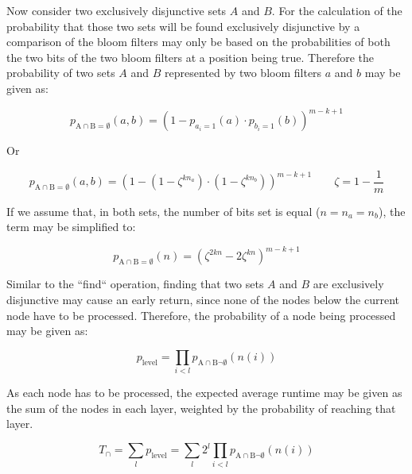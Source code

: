         Now consider two exclusively disjunctive sets $A$ and $B$.
        For the calculation of the probability that those two sets will be found
        exclusively disjunctive by a comparison of the bloom filters may only
        be based on the probabilities of both the two bits of the two bloom
        filters at a position being true.
        Therefore the probability of two sets $A$ and $B$ represented by two
        bloom filters $a$ and $b$ may be given as:

        \begin{equation}
            p_{\mathrm{A \cap B = \emptyset}}(a, b) =
            \left( 1 - p_{a_i = 1}(a) \cdot p_{b_i = 1}(b) \right)^{m-k+1}
        \end{equation}

        Or

        \begin{equation}
            p_{\mathrm{A \cap B = \emptyset}}(a, b) =
            \left( 1 -
                \left(1 - \zeta^{kn_a} \right) \cdot
                \left(1 - \zeta^{kn_b} \right)
            \right)^{m-k+1}
            \qquad \zeta = 1 - \frac{1}{m}
        \end{equation}

        If we assume that, in both sets, the number of bits set is equal
        ($n = n_a = n_b$), the term may be simplified to:

        \begin{equation}
            p_{\mathrm{A \cap B = \emptyset}}(n) =
            \left( \zeta^{2kn} -2\zeta^{kn} \right)^{m-k+1}
        \end{equation}

        Similar to the ``find`` operation, finding that two sets $A$ and $B$ are
        exclusively disjunctive may cause an early return, since none of the nodes
        below the current node have to be processed.
        Therefore, the probability of a node being processed may be given as:

        \begin{equation}
            p_\mathrm{level} =
            \prod_{i<l} p_{\mathrm{A \cap B \neg \emptyset}}(n(i))
        \end{equation}

        As each node has to be processed, the expected average runtime may be
        given as the sum of the nodes in each layer, weighted by the probability
        of reaching that layer.

        \begin{equation}
            T_{\cap} = \sum_l p_\mathrm{level} =
            \sum_l 2^l \prod_{i<l} p_{\mathrm{A \cap B \neg \emptyset}}(n(i))
        \end{equation}

